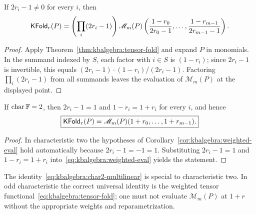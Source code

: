 \begin{corollary}\label{cor:kbalgebra:weighted-eval}
If $2r_i-1\neq0$ for every $i$, then
\begin{equation}\label{eq:kbalgebra:weighted-eval}
 \mathsf{KFold}_r(P)=\left(\prod_i(2r_i-1)\right)
 \mathscr M_m(P)\left(\frac{1-r_0}{2r_0-1},\ldots,\frac{1-r_{m-1}}{2r_{m-1}-1}\right).
\end{equation}
\end{corollary}
\begin{proof}
Apply Theorem~\ref{thm:kbalgebra:tensor-fold} and expand $P$ in monomials. In the summand indexed by $S$, each factor with $i\in S$ is $(1-r_i)$; since $2r_i-1$ is invertible, this equals $(2r_i-1)\cdot(1-r_i)/(2r_i-1)$. Factoring $\prod_i(2r_i-1)$ from all summands leaves the evaluation of $\mathscr M_m(P)$ at the displayed point.
\end{proof}

\begin{corollary}\label{cor:kbalgebra:char2-multilinear}
If $\operatorname{char}\mathbb{F}=2$, then $2r_i-1=1$ and $1-r_i=1+r_i$ for every $i$, and hence
\begin{equation}\label{eq:kbalgebra:char2-multilinear}
 \boxed{\mathsf{KFold}_r(P)=\mathscr M_m(P)(1+r_0,\ldots,1+r_{m-1}).}
\end{equation}
\end{corollary}
\begin{proof}
In characteristic two the hypotheses of Corollary~\ref{cor:kbalgebra:weighted-eval} hold automatically because $2r_i-1=-1=1$. Substituting $2r_i-1=1$ and $1-r_i=1+r_i$ into~\eqref{eq:kbalgebra:weighted-eval} yields the statement.
\end{proof}

\begin{remark}
The identity~\eqref{eq:kbalgebra:char2-multilinear} is special to characteristic two. In odd characteristic the correct universal identity is the weighted tensor functional~\eqref{eq:kbalgebra:tensor-fold}; one must not evaluate $\mathscr M_m(P)$ at $1+r$ without the appropriate weights and reparametrization.
\end{remark}

